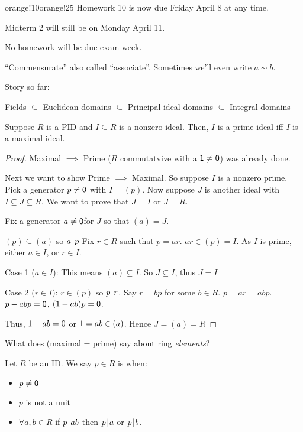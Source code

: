 \documentclass[notes.tex]{subfiles}
\begin{document}
\begin{classnote}{orange!10}{orange!25}
	Homework 10 is now due Friday April 8 at any time.

	Midterm 2 will still be on Monday April 11.

	No homework will be due exam week.
\end{classnote}

\begin{remark}
	``Commensurate'' also called ``associate''.
	Sometimes we'll even write $a\sim b$.
\end{remark}

Story so far: 
\begin{center}
	Fields $\subseteq$ Euclidean domains $\subseteq$ Principal ideal domains $\subseteq$ Integral domains %
\end{center}

\begin{proposition}
	Suppose $R$ is a PID and $I\subseteq R$ is a nonzero ideal. Then, $I$ is a prime ideal iff $I$ is a maximal ideal.
\end{proposition}

\begin{proof}
	Maximal $\implies$ Prime ($R$ commutatvive with a $\mathsf{1}\ne\mathsf{0}$) was already done. 
 
	Next we want to show Prime $\implies$ Maximal.
	So suppose $I$ is a nonzero prime. Pick a generator $p\ne\mathsf{0}$ with $I = (p)$. Now suppose $J$ is another ideal with $I\subseteq J \subseteq R$. We want to prove that $J=I$ or $J=R$.

	Fix a generator $a\ne\mathsf{0}$for $J$ so that $(a) = J$.

	$(p)\subseteq (a)$ so $a\mkern2mu|\mkern1mu p$ Fix $r\in R$ such that $p = ar$. 
	$ar\in (p) = I$. As $I$ is prime, either $a\in I$, or $r\in I$.

	Case 1 ($a\in I$):
	\tabin
		This means $(a) \subseteq I$. So $J\subseteq I$, thus $J=I$
	\tabout

	Case 2 ($r\in I$):
	\tabin
		$r\in (p)$ so $p\mkern2mu|\mkern1mu r$.
		Say $r=bp$ for some $b\in R$.
		$p=ar=abp$.
		$p-abp = \mathsf{0}$, $(\mathsf{1}-ab)p=\mathsf{0}$.

		Thus, $\mathsf{1}-ab = \mathsf{0}$ or $\mathsf{1} = ab \in (a)$. Hence $J = (a) = R$
	\tabout
\end{proof}

What does (maximal = prime) say about ring \emph{elements}?

\begin{defn}
	Let $R$ be an ID. We say $p\in R$ is  when:
	\begin{itemize}
		\item $p\ne\mathsf{0}$
		\item $p$ is not a unit
		\item $\forall a,b\in R$ if $p\mkern2mu|\mkern1mu ab$ then $p\mkern2mu|\mkern1mu a$ or $p\mkern2mu|\mkern1mu b$.
	\end{itemize}
\end{defn}
\end{document}
